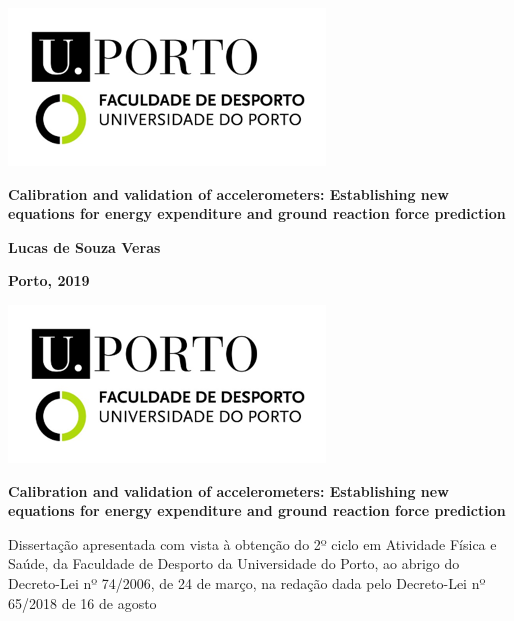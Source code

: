 \documentclass[12pt]{article}
\def\blankpage{%
      \clearpage%
      \thispagestyle{empty}%
      \addtocounter{page}{+0}%
      \null%
      \clearpage}
\begin{document}

\begin{center}
\includegraphics[width=\columnwidth]{figs/UPorto.png}

\vspace{6em}

\textbf{\Large Calibration and validation of accelerometers: Establishing new equations for energy expenditure and ground reaction force prediction}

\vspace{\fill}

\textbf{Lucas de Souza Veras}

\medskip

\textbf{Porto, 2019}
\end{center}

\thispagestyle{empty}
\blankpage

\begin{center}
\includegraphics{figs/UPorto.png}


\vspace{4em}

\Large \textbf{Calibration and validation of accelerometers: Establishing new equations for energy expenditure and ground reaction force prediction}
\end{center}

\vspace{6em}

\begingroup
\setlength{\leftskip}{3.75cm} \noindent Dissertação apresentada com vista à obtenção do 2º ciclo em Atividade Física e Saúde, da Faculdade de Desporto da Universidade do Porto, ao abrigo do Decreto-Lei nº 74/2006, de 24 de março, na redação dada pelo Decreto-Lei nº 65/2018 de 16 de agosto
\par
\endgroup
\end{document}
